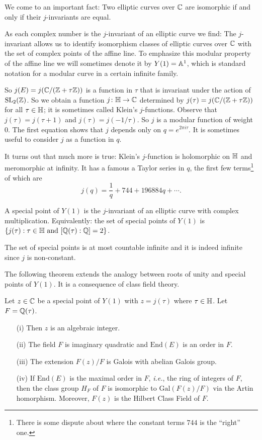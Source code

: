 We come to an important fact: Two elliptic curves over ${\mathbb{C}}$ are
isomorphic if and only if their $j$-invariants are equal.

As each complex number is the $j$-invariant of an elliptic curve we
find: The $j$-invariant allows us to identify isomorphism classes of
elliptic curves over ${\mathbb{C}}$ with the set of complex points of the
affine line. To emphasize this modular property of the affine line we
will sometimes denote it by $Y(1)={\mathbb{A}}^1$, which is standard notation
for a modular curve in a certain infinite family.

So $j(E) = j({\mathbb{C}}/({\mathbb{Z}}+\tau{\mathbb{Z}}))$ is a function in $\tau$ that is
invariant under the action of $\mathrm{SL}_2({\mathbb{Z}})$. So we obtain a
function $j\colon {\mathbb{H}}\rightarrow {\mathbb{C}}$ determined by $j(\tau) =
j({\mathbb{C}}/({\mathbb{Z}}+\tau{\mathbb{Z}}))$ for all $\tau\in{\mathbb{H}}$; it is sometimes called
Klein's $j$-functions. Observe that $j(\tau)=j(\tau+1)$ and $j(\tau) =
j(-1/\tau)$. So $j$ is a modular function of weight $0$. The first
equation shows that $j$ depends only on $q=e^{2\pi i \tau}$. It is
sometimes useful to consider $j$ as a function in $q$.

It turns out that much more is true: Klein's $j$-function is
holomorphic on ${\mathbb{H}}$ and meromorphic at infinity. It has a famous 
a Taylor series in $q$, the first few terms\footnote{There is some
  dispute about where the constant terms $744$ is the ``right'' one.} of which are 
\begin{equation*}
  j(q) = \frac 1q + 744 + 196884q +\cdots. 
\end{equation*}

\begin{definition}
  \label{def:specialY1}
  A special point of $Y(1)$ is the $j$-invariant of an elliptic curve
  with complex multiplication. Equivalently: the set of special points
  of $Y(1)$ is $\{j(\tau) : \tau\in{\mathbb{H}} \text{ and }[{\mathbb{Q}}(\tau):{\mathbb{Q}}]=2\}$. 
\end{definition}

The set of special points is at most countable infinite and it is
indeed infinite since $j$ is non-constant.

The following theorem extends the analogy between roots of unity and
special points of $Y(1)$. It is a consequence of class field theory. 
\begin{theorem}
  \label{thm:galoisspecial}
  Let $z\in {\mathbb{C}}$ be a special point of $Y(1)$ with $z=j(\tau)$ where
  $\tau\in {\mathbb{H}}$. Let $F={\mathbb{Q}}(\tau)$.
  \begin{enumerate}
  \item [(i)] Then $z$ is an algebraic integer.
  \item[(ii)] The field $F$ is
    imaginary quadratic and   $\mathrm{End}(E)$ is an order
    in $F$.
  \item[(iii)] The extension $F(z)/F$ is Galois with abelian Galois
    group.
  \item[(iv)] If $\mathrm{End}(E)$ is the maximal order in $F$,
    \textit{i.e.}, the ring of integers of $F$, then
    the class group $H_F$ of $F$ is isomorphic to
    $\mathrm{Gal}(F(z)/F)$ via the Artin homorphism.
    Moreover, $F(z)$ is the Hilbert Class Field of $F$. 
  \end{enumerate}
\end{theorem}

